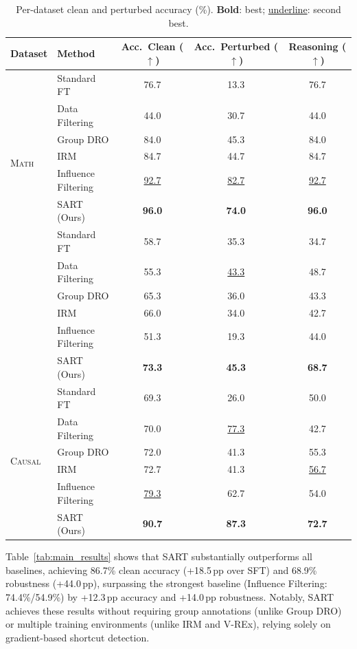 \begin{table}[t]
\centering
\caption{Per-dataset clean and perturbed accuracy (\%). \textbf{Bold}: best; \underline{underline}: second best.}
\label{tab:per_dataset}
\small
\begin{tabular}{llccc}
\toprule
\textbf{Dataset} & \textbf{Method} & \textbf{Acc.\ Clean} ($\uparrow$) & \textbf{Acc.\ Perturbed} ($\uparrow$) & \textbf{Reasoning} ($\uparrow$) \\
\midrule
\multirow{7}{*}{\textsc{Math}}
    & Standard FT          & 76.7 & 13.3 & 76.7 \\
    & Data Filtering       & 44.0 & 30.7 & 44.0 \\
    & Group DRO            & 84.0 & 45.3 & 84.0 \\
    & IRM                  & 84.7 & 44.7 & 84.7 \\
    & Influence Filtering  & \underline{92.7} & \underline{82.7} & \underline{92.7} \\
    & SART (Ours)          & \textbf{96.0} & \textbf{74.0} & \textbf{96.0} \\
\midrule
\multirow{7}{*}{\textsc{Financial}}
    & Standard FT          & 58.7 & 35.3 & 34.7 \\
    & Data Filtering       & 55.3 & \underline{43.3} & 48.7 \\
    & Group DRO            & 65.3 & 36.0 & 43.3 \\
    & IRM                  & 66.0 & 34.0 & 42.7 \\
    & Influence Filtering  & 51.3 & 19.3 & 44.0 \\
    & SART (Ours)          & \textbf{73.3} & \textbf{45.3} & \textbf{68.7} \\
\midrule
\multirow{7}{*}{\textsc{Causal}}
    & Standard FT          & 69.3 & 26.0 & 50.0 \\
    & Data Filtering       & 70.0 & \underline{77.3} & 42.7 \\
    & Group DRO            & 72.0 & 41.3 & 55.3 \\
    & IRM                  & 72.7 & 41.3 & \underline{56.7} \\
    & Influence Filtering  & \underline{79.3} & 62.7 & 54.0 \\
    & SART (Ours)          & \textbf{90.7} & \textbf{87.3} & \textbf{72.7} \\
\bottomrule
\end{tabular}
\end{table}

Table~\ref{tab:main_results} shows that SART substantially outperforms all baselines, achieving 86.7\% clean accuracy (+18.5\,pp over SFT) and 68.9\% robustness (+44.0\,pp), surpassing the strongest baseline (Influence Filtering: 74.4\%/54.9\%) by +12.3\,pp accuracy and +14.0\,pp robustness. Notably, SART achieves these results without requiring group annotations (unlike Group DRO) or multiple training environments (unlike IRM and V-REx), relying solely on gradient-based shortcut detection.

